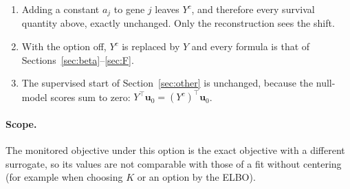 \documentclass[11pt]{article}
\begin{document}
\begin{keybox}
\begin{enumerate}
\item Adding a constant $a_j$ to gene $j$ leaves $Y^c$, and therefore every
survival quantity above, exactly unchanged. Only the reconstruction sees the
shift.
\item With the option off, $Y^c$ is replaced by $Y$ and every formula is that of
Sections~\ref{sec:beta}--\ref{sec:F}.
\item The supervised start of Section~\ref{sec:other} is unchanged, because the
null-model scores sum to zero: $Y^\top\bm u_0 = (Y^c)^\top\bm u_0$.
\end{enumerate}
\end{keybox}

\paragraph{Scope.} The monitored objective under this option is the exact objective
with a different surrogate, so its values are not comparable with those of a fit
without centering (for example when choosing $K$ or an option by the ELBO).
\end{document}

